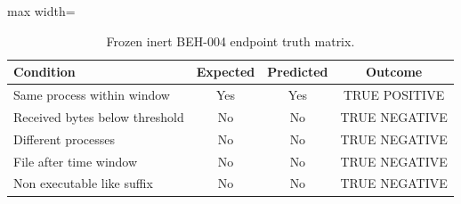 \begin{table}[htbp]
\centering
\caption{Frozen inert BEH-004 endpoint truth matrix.}
\label{tab:endpoint-beh004}
\small
\begin{adjustbox}{max width=\columnwidth}
\begin{tabular}{lccc}
\toprule
Condition & Expected & Predicted & Outcome \\
\midrule
Same process within window & Yes & Yes & TRUE POSITIVE \\
Received bytes below threshold & No & No & TRUE NEGATIVE \\
Different processes & No & No & TRUE NEGATIVE \\
File after time window & No & No & TRUE NEGATIVE \\
Non executable like suffix & No & No & TRUE NEGATIVE \\
\bottomrule
\end{tabular}
\end{adjustbox}
\par{}
\par{}
\end{table}
